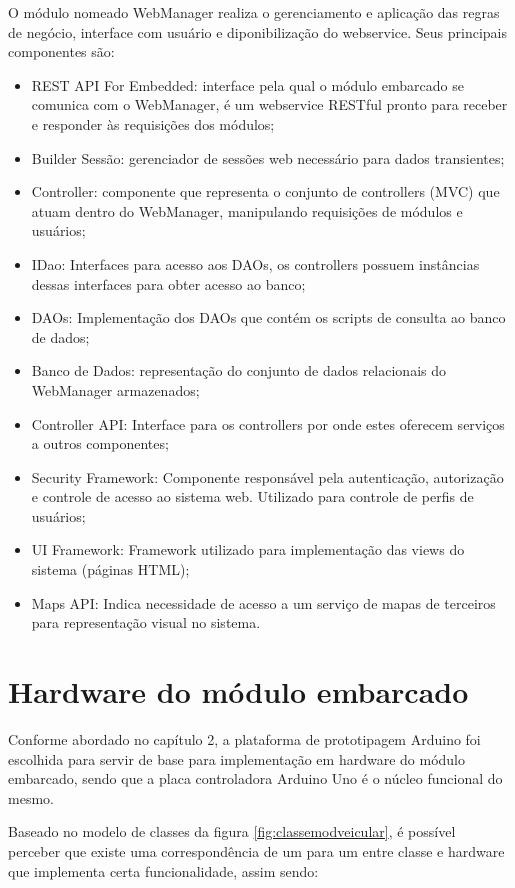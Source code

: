 O módulo nomeado WebManager realiza o gerenciamento e aplicação das regras de negócio, interface com usuário e diponibilização do webservice. Seus principais componentes são:

\begin{itemize}
	\item REST API For Embedded: interface pela qual o módulo embarcado se comunica com o WebManager, é um webservice RESTful pronto para receber e responder às requisições dos módulos;
	\item Builder Sessão: gerenciador de sessões web necessário para dados transientes;
	\item Controller: componente que representa o conjunto de controllers (MVC) que atuam dentro do WebManager, manipulando requisições de módulos e usuários;
	\item IDao: Interfaces para acesso aos DAOs, os controllers possuem instâncias dessas interfaces para obter acesso ao banco;
	\item DAOs: Implementação dos DAOs que contém os scripts de consulta ao banco de dados;
	\item Banco de Dados: representação do conjunto de dados relacionais do WebManager armazenados;
	\item Controller API: Interface para os controllers por onde estes oferecem serviços a outros componentes;
	\item Security Framework: Componente responsável pela autenticação, autorização e controle de acesso ao sistema web. Utilizado para controle de perfis de usuários;
	\item UI Framework: Framework utilizado para implementação das views do sistema (páginas HTML);
	\item Maps API: Indica necessidade de acesso a um serviço de mapas de terceiros para representação visual no sistema.
\end{itemize}

\section{Hardware do módulo embarcado}

Conforme abordado no capítulo 2, a plataforma de prototipagem Arduino foi escolhida para servir de base para implementação em hardware do módulo embarcado, sendo que a placa controladora Arduino Uno é o núcleo funcional do mesmo. 

Baseado no modelo de classes da figura \ref{fig:classemodveicular}, é possível perceber que existe uma correspondência de um para um entre classe e hardware que implementa certa funcionalidade, assim sendo:

